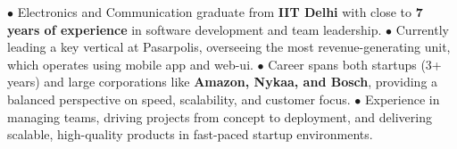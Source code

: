 \documentclass[9pt]{developercv} %
\begin{document}
\vspace{0.5cm}



\begin{minipage}[t]{0.6\textwidth} %
	\vspace{-\baselineskip} %
	
	 $\bullet$ Electronics and Communication graduate from \textbf{IIT Delhi} with close to  \textbf{7 years of experience} in software development and team leadership. $\bullet$ Currently leading a key vertical at Pasarpolis, overseeing the most revenue-generating unit, which operates using mobile app and web-ui. $\bullet$ Career spans both startups (3+ years) and large corporations like  \textbf{Amazon, Nykaa, and Bosch}, providing a balanced perspective on speed, scalability, and customer focus. $\bullet$ Experience in managing teams, driving projects from concept to deployment, and delivering scalable, high-quality products in fast-paced startup environments.\\ \\%
\end{minipage}
\hfill %
\begin{minipage}[t]{0.35\textwidth} %
	\vspace{-\baselineskip} %
	\begin{barchart}{4} %
	\end{barchart}
\end{minipage}


\end{document}
